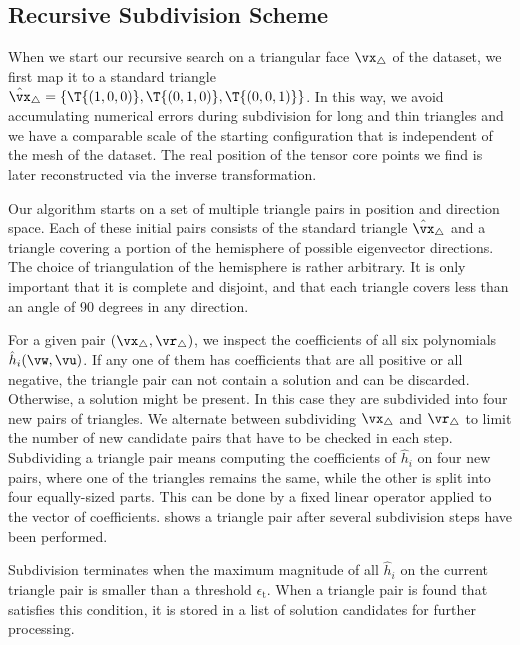 \subsection{Recursive Subdivision Scheme} %
\label{sub:recursive_subdivision_scheme}
%
When we start our recursive search on a triangular face $\vx_\triangle$ of the
dataset, we first map it to a standard triangle
$\hat\vx_\triangle = \{\T{(1, 0, 0)}, \T{(0,1,0)}, \T{(0, 0, 1)}\}$.
%
In this way, we avoid accumulating numerical errors during subdivision for long
and thin triangles and we have a comparable scale of the starting configuration
that is independent of the mesh of the dataset.
% 
The real position of the tensor core points we find is later reconstructed via
the inverse transformation.
%

%
Our algorithm starts on a set of multiple triangle pairs in position and
direction space.
%
Each of these initial pairs consists of the standard triangle
$\hat\vx_\triangle$ and a triangle covering a portion of the hemisphere of
possible eigenvector directions.
% 
The choice of triangulation of the hemisphere is rather arbitrary.
% 
It is only important that it is complete and disjoint, and that each triangle
covers less than an angle of 90 degrees in any direction.
% 

% 
For a given pair $(\vx_\triangle, \vr_\triangle)$, we inspect the coefficients
of all six polynomials $\hat{h}_i(\vw, \vu)$.
%
If any one of them has coefficients that are all positive or all negative, the
triangle pair can not contain a solution and can be discarded.
%
Otherwise, a solution might be present.
%
In this case they are subdivided into four new pairs of triangles.
%
We alternate between subdividing $\vx_\triangle$ and $\vr_\triangle$ to limit
the number of new candidate pairs that have to be checked in each step.
%
Subdividing a triangle pair means computing the coefficients of $\hat{h}_i$ on
four new pairs, where one of the triangles remains the same, while the other is
split into four equally-sized parts.
%
This can be done by a fixed linear operator applied to the vector of
coefficients.
%
 shows a triangle pair after several subdivision
steps have been performed.
%



%
Subdivision terminates when the maximum magnitude of all $\hat{h}_i$ on the
current triangle pair is smaller than a threshold $\epsilon_{\mathrm{t}}$.
%
When a triangle pair is found that satisfies this condition, it is stored in a
list of solution candidates for further processing.
%

